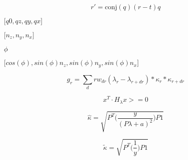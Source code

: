\documentclass{article}
\begin{document}
\[ r' = \mathrm{conj}(q)(r-t)q \]
\pagebreak

${[}q0,qz,qy,qx{]}$
\pagebreak

${[}n_z,n_y,n_x{]}$
\pagebreak

$\phi$
\pagebreak

${[}cos(\phi),sin(\phi) n_z, sin(\phi) n_y, sin(\phi)n_x{]}$
\pagebreak

\[ g_r = \sum_dr w_{dr} (\lambda_r - \lambda_{r+dr}) * \kappa_r * \kappa_{r+dr} \]
\pagebreak

\[ x^T \cdot H_{\lambda}x >= 0 \]
\pagebreak

\[ \hat\kappa = \sqrt{ P^T \bigg( \frac{y}{ (P\lambda+a)^2 } \bigg) P1 } \]
\pagebreak

\[ \tilde\kappa = \sqrt{ P^T \bigg( \frac{1}{y} \bigg)P1 } \]
\pagebreak
\end{document}
